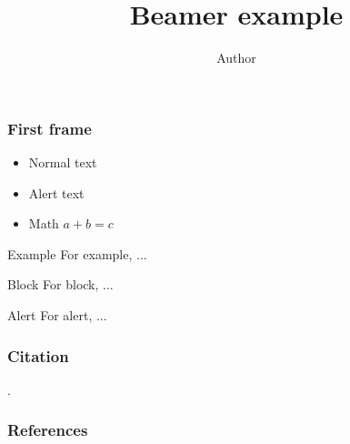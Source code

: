 \documentclass[aspectratio=169]{beamer}
\title{Beamer example}
\author{Author}
\begin{document}
\maketitle

\begin{frame}
  \frametitle{First frame}
  \begin{itemize}
  \item Normal text
  \item \alert{Alert text}
  \item Math \(a + b = c\)
  \end{itemize}
  \begin{exampleblock}{Example}
    For example, ...
  \end{exampleblock}
  \begin{block}{Block}
    For block, ...
  \end{block}
  \begin{alertblock}{Alert}
    For alert, ...
  \end{alertblock}
\end{frame}

\begin{frame}
  \frametitle{Citation}
  \Textcite{maclane1992sheaves}.
\end{frame}

\begin{frame}[allowframebreaks]
  \frametitle{References}
  \printbibliography
\end{frame}
\end{document}
